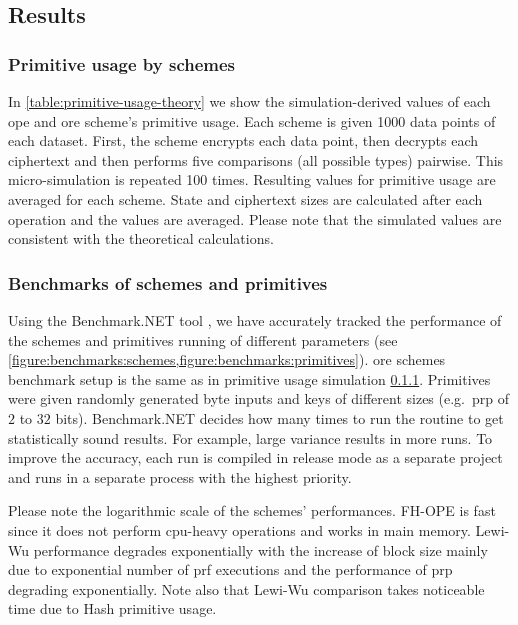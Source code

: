 	\subsection{Results}

		\subsubsection{Primitive usage by schemes}\label{section:range-snapshot:schemes-primitive-usage}

			In \cref{table:primitive-usage-theory} we show the simulation-derived values of each \acrshort{ope} and \acrshort{ore} scheme's primitive usage.
			Each scheme is given \num{1000} data points of each dataset.
			First, the scheme encrypts each data point, then decrypts each ciphertext and then performs five comparisons (all possible types) pairwise.
			This micro-simulation is repeated \num{100} times.
			Resulting values for primitive usage are averaged for each scheme.
			State and ciphertext sizes are calculated after each operation and the values are averaged.
			Please note that the simulated values are consistent with the theoretical calculations.

		\subsubsection{Benchmarks of schemes and primitives}

			Using the Benchmark.NET tool \cite{benchmark-net}, we have accurately tracked the performance of the schemes and primitives running of different parameters (see \cref{figure:benchmarks:schemes,figure:benchmarks:primitives}).
			\acrshort{ore} schemes benchmark setup is the same as in primitive usage simulation \cref{section:range-snapshot:schemes-primitive-usage}.
			Primitives were given randomly generated byte inputs and keys of different sizes (e.g.\ \acrshort{prp} of $2$ to $32$ bits).
			Benchmark.NET decides how many times to run the routine to get statistically sound results.
			For example, large variance results in more runs.
			To improve the accuracy, each run is compiled in release mode as a separate project and runs in a separate process with the highest priority.

			Please note the logarithmic scale of the schemes' performances.
			FH-OPE is fast since it does not perform \acrshort{cpu}-heavy operations and works in main memory.
			Lewi-Wu performance degrades exponentially with the increase of block size mainly due to exponential number of \acrshort{prf} executions and the performance of \acrshort{prp} degrading exponentially.
			Note also that Lewi-Wu comparison takes noticeable time due to Hash primitive usage.

